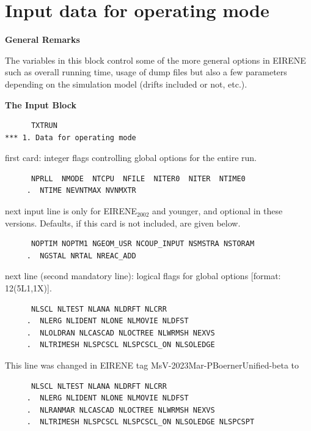 \section{Input data for operating mode} \label{sec2.1}

\textbf{General Remarks}

\medskip

The variables in this block control some of the more general options in EIRENE
such as overall running time, usage of dump files but also a few parameters
depending on the simulation model (drifts included or not, etc.).

\medskip

\textbf{The Input Block}

\begin{lstlisting}
      TXTRUN
*** 1. Data for operating mode
\end{lstlisting}

first card:  integer flags controlling global options for the entire run.

\begin{lstlisting}
      NPRLL  NMODE  NTCPU  NFILE  NITER0  NITER  NTIME0
     .  NTIME NEVNTMAX NVNMXTR
\end{lstlisting}

next input line is only for EIRENE$_{2002}
$ and younger, and optional in these versions.
Defaults, if this card is not included, are given below.

\begin{lstlisting}
      NOPTIM NOPTM1 NGEOM_USR NCOUP_INPUT NSMSTRA NSTORAM
     .  NGSTAL NRTAL NREAC_ADD
\end{lstlisting}

next line (second mandatory line): logical flags for global options [format:
    12(5L1,1X)].

\begin{lstlisting}
      NLSCL NLTEST NLANA NLDRFT NLCRR
     .  NLERG NLIDENT NLONE NLMOVIE NLDFST
     .  NLOLDRAN NLCASCAD NLOCTREE NLWRMSH NEXVS
     .  NLTRIMESH NLSPCSCL NLSPCSCL_ON NLSOLEDGE
\end{lstlisting}

This line was changed in EIRENE tag MsV-2023Mar-PBoernerUnified-beta to

\begin{lstlisting}
      NLSCL NLTEST NLANA NLDRFT NLCRR
     .  NLERG NLIDENT NLONE NLMOVIE NLDFST
     .  NLRANMAR NLCASCAD NLOCTREE NLWRMSH NEXVS
     .  NLTRIMESH NLSPCSCL NLSPCSCL_ON NLSOLEDGE NLSPCSPT
\end{lstlisting}

